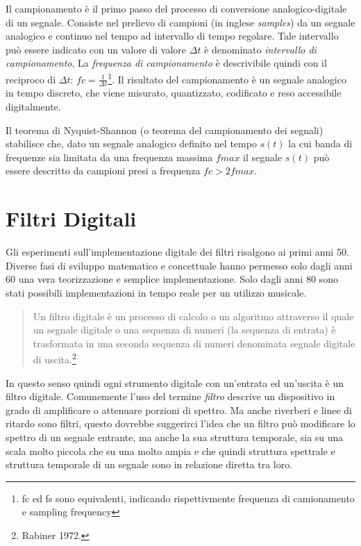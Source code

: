 Il campionamento è il primo passo del processo di conversione analogico-digitale
di un segnale. Consiste nel prelievo di campioni (in inglese \emph{samples}) da
un segnale analogico e continuo nel tempo ad intervallo di tempo regolare.
Tale intervallo può essere indicato con un valore di valore $ \Delta t $ è denominato
\emph{intervallo di campionamento}. La \emph{frequenza di campionamento} è
descrivibile quindi con il reciproco di
$ \Delta t $: $ fc = \frac{1}{\Delta t} $\footnote{fc ed fs sono equivalenti,
indicando rispettivmente frequenza di camionamento e sampling frequency}.
Il risultato del campionamento è un segnale analogico in tempo discreto,
che viene misurato, quantizzato, codificato e reso accessibile digitalmente.

Il teorema di Nyquist-Shannon (o teorema del campionamento dei segnali) stabilisce
che, dato un segnale analogico definito nel tempo $ s(t) $ la cui banda di frequenze
sia limitata da una frequenza massima $fmax$ il segnale $ s(t) $ può essere descritto
da campioni presi a frequenza $ fc > 2fmax $.

\clearpage

\section{Filtri Digitali}

Gli esperimenti sull'implementazione digitale dei filtri risalgono ai primi anni 50.
Diverse fasi di sviluppo matematico e concettuale hanno permesso solo dagli anni 60
una vera teorizzazione e semplice implementazione. Solo dagli anni 80 sono stati
possibili implementazioni in tempo reale per un utilizzo musicale.

\begin{quote}
  Un filtro digitale è un processo di calcolo o un algoritmo attraverso il quale
  un segnale digitale o una sequenza di numeri (la sequenza di entrata) è
  trasformata in una seconda sequenza di numeri denominata segnale digitale di
  uscita.\footnote{Rabiner 1972.}
\end{quote}

In questo senso quindi ogni strumento digitale con un'entrata ed un'uscita è un
filtro digitale. Comunemente l'uso del termine \emph{filtro} descrive un dispositivo
in grado di amplificare o attenuare porzioni di spettro. Ma anche riverberi e linee
di ritardo sono filtri, questo dovrebbe suggerirci l'idea che un filtro può
modificare lo spettro di un segnale entrante, ma anche la sua struttura temporale,
sia su una scala molto piccola che su una molto ampia e che quindi struttura
spettrale e struttura temporale di un segnale sono in relazione diretta tra loro.

